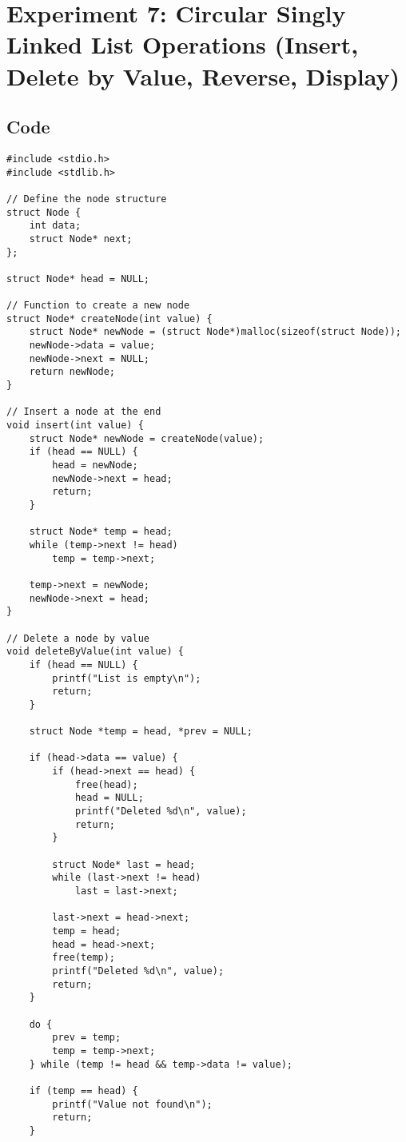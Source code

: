 \documentclass[12pt,a4paper]{article}
\begin{document}
\newpage
\section*{Experiment 7: Circular Singly Linked List Operations (Insert, Delete by Value, Reverse, Display)}

\subsection*{Code}
\begin{lstlisting}
#include <stdio.h>
#include <stdlib.h>

// Define the node structure
struct Node {
    int data;
    struct Node* next;
};

struct Node* head = NULL;

// Function to create a new node
struct Node* createNode(int value) {
    struct Node* newNode = (struct Node*)malloc(sizeof(struct Node));
    newNode->data = value;
    newNode->next = NULL;
    return newNode;
}

// Insert a node at the end
void insert(int value) {
    struct Node* newNode = createNode(value);
    if (head == NULL) {
        head = newNode;
        newNode->next = head;
        return;
    }

    struct Node* temp = head;
    while (temp->next != head)
        temp = temp->next;

    temp->next = newNode;
    newNode->next = head;
}

// Delete a node by value
void deleteByValue(int value) {
    if (head == NULL) {
        printf("List is empty\n");
        return;
    }

    struct Node *temp = head, *prev = NULL;

    if (head->data == value) {
        if (head->next == head) {
            free(head);
            head = NULL;
            printf("Deleted %d\n", value);
            return;
        }

        struct Node* last = head;
        while (last->next != head)
            last = last->next;

        last->next = head->next;
        temp = head;
        head = head->next;
        free(temp);
        printf("Deleted %d\n", value);
        return;
    }

    do {
        prev = temp;
        temp = temp->next;
    } while (temp != head && temp->data != value);

    if (temp == head) {
        printf("Value not found\n");
        return;
    }


\end{lstlisting}
\end{document}
